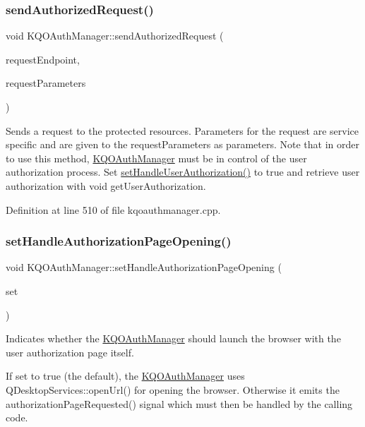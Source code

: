\subsubsection{\texorpdfstring{send\+Authorized\+Request()}{sendAuthorizedRequest()}}
{\footnotesize\ttfamily void K\+Q\+O\+Auth\+Manager\+::send\+Authorized\+Request (\begin{DoxyParamCaption}\item[{Q\+Url}]{request\+Endpoint,  }\item[{const K\+Q\+O\+Auth\+Parameters \&}]{request\+Parameters }\end{DoxyParamCaption})}

Sends a request to the protected resources. Parameters for the request are service specific and are given to the \textquotesingle{}request\+Parameters\textquotesingle{} as parameters. Note that in order to use this method, \hyperlink{class_k_q_o_auth_manager}{K\+Q\+O\+Auth\+Manager} must be in control of the user authorization process. Set \hyperlink{class_k_q_o_auth_manager_a55409df469317596b81ab50823eb6a97}{set\+Handle\+User\+Authorization()} to true and retrieve user authorization with void get\+User\+Authorization. 

Definition at line 510 of file kqoauthmanager.\+cpp.

\mbox{\label{class_k_q_o_auth_manager_a6da0168889f374d2b2d8e3a2ac0efe7d}} 
\subsubsection{\texorpdfstring{set\+Handle\+Authorization\+Page\+Opening()}{setHandleAuthorizationPageOpening()}}
{\footnotesize\ttfamily void K\+Q\+O\+Auth\+Manager\+::set\+Handle\+Authorization\+Page\+Opening (\begin{DoxyParamCaption}\item[{bool}]{set }\end{DoxyParamCaption})}

Indicates whether the \hyperlink{class_k_q_o_auth_manager}{K\+Q\+O\+Auth\+Manager} should launch the browser with the user authorization page itself.

If set to true (the default), the \hyperlink{class_k_q_o_auth_manager}{K\+Q\+O\+Auth\+Manager} uses Q\+Desktop\+Services\+::open\+Url() for opening the browser. Otherwise it emits the authorization\+Page\+Requested() signal which must then be handled by the calling code. 

